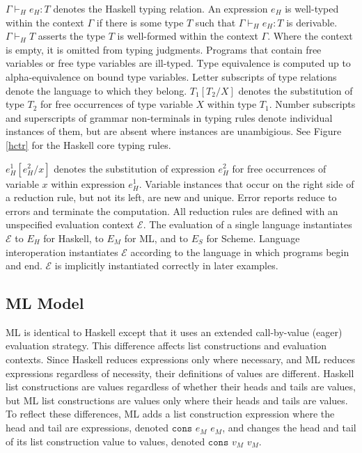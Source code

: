 

$\Gamma\vdash_{H}e_{H}:T$ denotes the Haskell typing relation.  An expression $e_{H}$ is well-typed within the context $\Gamma$ if there is some type $T$ such that $\Gamma\vdash_{H}e_{H}:T$ is derivable.  $\Gamma\vdash_{H}T$ asserts the type $T$ is well-formed within the context $\Gamma$.  Where the context is empty, it is omitted from typing judgments.  Programs that contain free variables or free type variables are ill-typed.  Type equivalence is computed up to alpha-equivalence on bound type variables.  Letter subscripts of type relations denote the language to which they belong.  $T_{1}[T_{2}/X]$ denotes the substitution of type $T_{2}$ for free occurrences of type variable $X$ within type $T_{1}$.  Number subscripts and superscripts of grammar non-terminals in typing rules denote individual instances of them, but are absent where instances are unambigious.  See Figure \ref{hctr} for the Haskell core typing rules.



$e_{H}^{1}[e_{H}^{2}/x]$ denotes the substitution of expression $e_{H}^{2}$ for free occurrences of variable $x$ within expression $e_{H}^{1}$.  Variable instances that occur on the right side of a reduction rule, but not its left, are new and unique.  Error reports reduce to errors and terminate the computation.  All reduction rules are defined with an unspecified evaluation context $\mathscr{E}$.  The evaluation of a single language instantiates $\mathscr{E}$ to $E_{H}$ for Haskell, to $E_{M}$ for ML, and to $E_{S}$ for Scheme.  Language interoperation instantiates $\mathscr{E}$ according to the language in which programs begin and end.  $\mathscr{E}$ is implicitly instantiated correctly in later examples.



\subsection{ML Model}

ML is identical to Haskell except that it uses an extended call-by-value (eager) evaluation strategy.  This difference affects list constructions and evaluation contexts.  Since Haskell reduces expressions only where necessary, and ML reduces expressions regardless of necessity, their definitions of values are different.  Haskell list constructions are values regardless of whether their heads and tails are values, but ML list constructions are values only where their heads and tails are values.  To reflect these differences, ML adds a list construction expression where the head and tail are expressions, denoted $\mathtt{cons}$ $e_{M}$ $e_{M}$, and changes the head and tail of its list construction value to values, denoted $\mathtt{cons}$ $v_{M}$ $v_{M}$.

